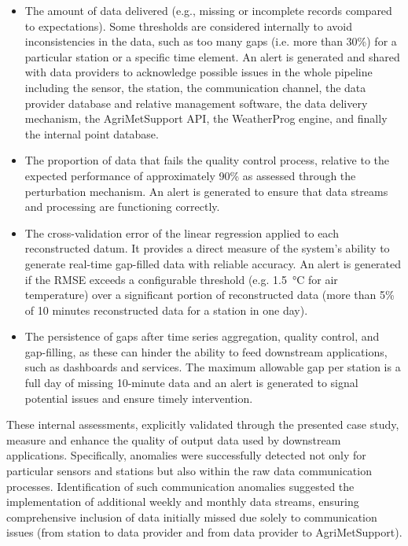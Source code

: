 \documentclass[authoryear,preprint,review,12pt]{elsarticle}
\begin{document}
\begin{itemize}
    \item The amount of data delivered (e.g., missing or incomplete records compared to expectations). Some thresholds are considered internally to avoid inconsistencies in the data, such as too many gaps (i.e. more than 30\%) for a particular station or a specific time element. An alert is generated and shared with data providers to acknowledge possible issues in the whole pipeline including the sensor, the station, the communication channel, the data provider database and relative management software, the data delivery mechanism, the AgriMetSupport API, the WeatherProg engine, and finally the internal point database.
    \item The proportion of data that fails the quality control process, relative to the expected performance of approximately 90\% as assessed through the perturbation mechanism. An alert is generated to ensure that data streams and processing are functioning correctly.
    \item The cross-validation error of the linear regression applied to each reconstructed datum.
    It provides a direct measure of the system’s ability to generate real-time gap-filled data with reliable accuracy. 
    An alert is generated if the RMSE exceeds a configurable threshold (e.g. \SI{1.5}{\degreeCelsius} for air temperature) over a significant portion of reconstructed data (more than 5\% of 10 minutes reconstructed data for a station in one day).
    \item The persistence of gaps after time series aggregation, quality control, and gap-filling, as these can hinder the ability to feed downstream applications, such as dashboards and services. 
    The maximum allowable gap per station is a full day of missing 10-minute data and an alert is generated to signal potential issues and ensure timely intervention.
\end{itemize}
These internal assessments, explicitly validated through the presented case study, measure and enhance the quality of output data used by downstream applications.
Specifically, anomalies were successfully detected not only for particular sensors and stations but also within the raw data communication processes.
Identification of such communication anomalies suggested the implementation of additional weekly and monthly data streams, ensuring comprehensive inclusion of data initially missed due solely to communication issues (from station to data provider and from data provider to AgriMetSupport).
\end{document}
